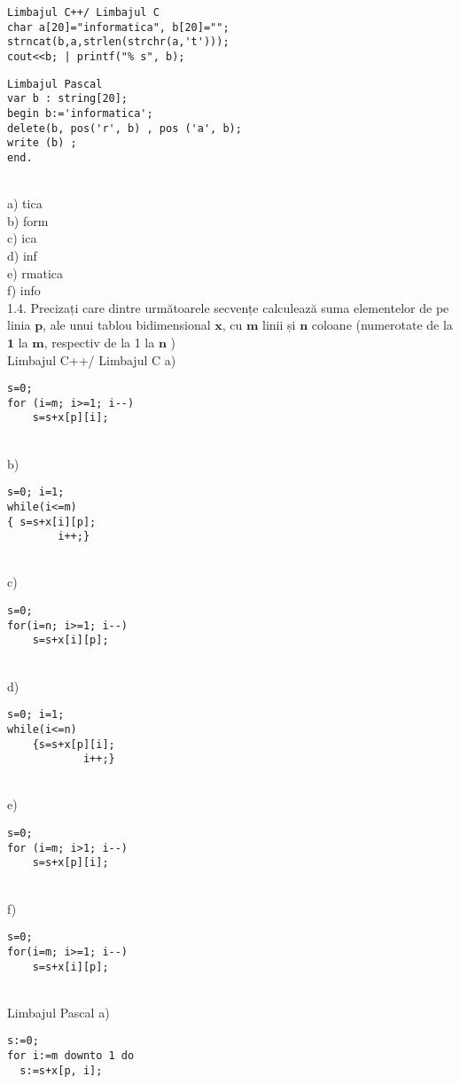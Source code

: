 \begin{verbatim}
Limbajul C++/ Limbajul C
char a[20]="informatica", b[20]="";
strncat(b,a,strlen(strchr(a,'t')));
cout<<b; | printf("% s", b);
\end{verbatim}
\begin{verbatim}
Limbajul Pascal
var b : string[20];
begin b:='informatica';
delete(b, pos('r', b) , pos ('a', b); 
write (b) ;
end.
\end{verbatim}
\\
a) tica
\\
b) form
\\
c) ica
\\
d) inf
\\
e) rmatica
\\
f) info
\\
1.4. Precizați care dintre următoarele secvențe calculează suma elementelor de pe linia $\mathbf{p}$, ale unui tablou bidimensional $\mathbf{x}$, cu $\mathbf{m}$ linii și $\mathbf{n}$ coloane (numerotate de la $\mathbf{1}$ la $\mathbf{m}$, respectiv de la 1 la $\mathbf{n}$ )
\\
Limbajul C++/ Limbajul C
a) \begin{verbatim}
s=0;
for (i=m; i>=1; i--)
    s=s+x[p][i];
\end{verbatim}
\\
b) \begin{verbatim}
s=0; i=1;
while(i<=m)
{ s=s+x[i][p];
        i++;}
\end{verbatim}
\\
c) \begin{verbatim}
s=0;
for(i=n; i>=1; i--)
    s=s+x[i][p];
\end{verbatim}
\\
d) \begin{verbatim}
s=0; i=1;
while(i<=n)
    {s=s+x[p][i];
            i++;}
\end{verbatim}
\\
e) \begin{verbatim}
s=0;
for (i=m; i>1; i--)
    s=s+x[p][i];
\end{verbatim}
\\
f) \begin{verbatim}
s=0;
for(i=m; i>=1; i--)
    s=s+x[i][p];
\end{verbatim}
\\
Limbajul Pascal
a) \begin{verbatim}
s:=0;
for i:=m downto 1 do
  s:=s+x[p, i];
\end{verbatim}
\\
